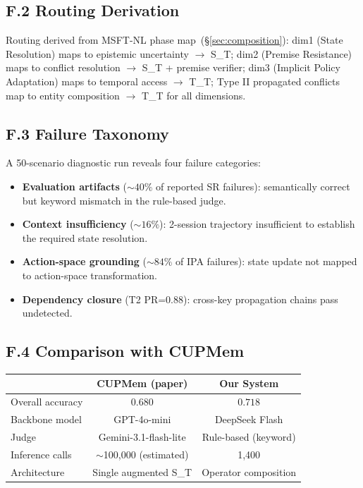 \documentclass[letterpaper,twocolumn,10pt]{article}
\begin{document}
\subsection*{F.2 Routing Derivation}%
\label{sec:stale-routing}%
Routing derived from MSFT-NL phase map~(\S\ref{sec:composition}): dim1 (State Resolution) maps to epistemic uncertainty $\rightarrow$ S\_T; dim2 (Premise Resistance) maps to conflict resolution $\rightarrow$ S\_T + premise verifier; dim3 (Implicit Policy Adaptation) maps to temporal access $\rightarrow$ T\_T; Type II propagated conflicts map to entity composition $\rightarrow$ T\_T for all dimensions.%

\subsection*{F.3 Failure Taxonomy}%
A 50-scenario diagnostic run reveals four failure categories:%
\begin{itemize}%
\item \textbf{Evaluation artifacts} ($\sim40\%$ of reported SR failures): semantically correct but keyword mismatch in the rule-based judge.%
\item \textbf{Context insufficiency} ($\sim16\%$): 2-session trajectory insufficient to establish the required state resolution.%
\item \textbf{Action-space grounding} ($\sim84\%$ of IPA failures): state update not mapped to action-space transformation.%
\item \textbf{Dependency closure} (T2 PR=0.88): cross-key propagation chains pass undetected.%
\end{itemize}%

\subsection*{F.4 Comparison with CUPMem}%
\begin{table}[h]%
\centering%
\footnotesize%
\begin{tabular}{lcc}%
\toprule%
 & CUPMem (paper) & Our System\\%
\midrule%
Overall accuracy & $0.680$ & $0.718$\\%
Backbone model & GPT-4o-mini & DeepSeek Flash\\%
Judge & Gemini-3.1-flash-lite & Rule-based (keyword)\\%
Inference calls & $\sim$100,000 (estimated) & 1,400\\%
Architecture & Single augmented S\_T & Operator composition\\%
\bottomrule%
\end{tabular}%
\end{table}%
\end{document}

